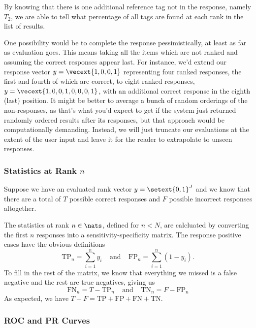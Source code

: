 By knowing that there is one additional reference tag not in the
response, namely $T_2$, we are able to tell what percentage of all
tags are found at each rank in the list of results.

One possibility would be to complete the response pessimistically, at
least as far as evaluation goes.  This means taking all the items
which are not ranked and assuming the correct responses appear last.
For instance, we'd extend our response vector $y = \vecext{1,0,0,1}$
representing four ranked responses, the first and fourth of which are
correct, to eight ranked responses, $y = \vecext{1,0,0,1,0,0,0,1}$,
with an additional correct response in the eighth (last) position.  It
might be better to average a bunch of random orderings of the
non-responses, as that's what you'd expect to get if the system just
returned randomly ordered results after its responses, but that
approach would be computationally demanding.  Instead, we will just
truncate our evaluations at the extent of the user input and leave
it for the reader to extrapolate to unseen responses.

\subsubsection{Statistics at Rank $n$}

Suppose we have an evaluated rank vector $y = \setext{0,1}^J$
and we know that there are a total of $T$ possible correct
responses and $F$ possible incorrect responses altogether.

The statistics at rank $n \in \nats$, defined for $n < N$, are
calcluated by converting the first $n$ responses into a
sensitivity-specificity matrix.  The response positive cases
have the obvious definitions
%
\begin{equation}
\mbox{TP}_n = \sum_{i=1}^n y_i
\ \ \ \ \ \mbox{and} \ \ \ \ \
\mbox{FP}_n = \sum_{i=1}^n (1-y_i).
\end{equation}
%
To fill in the rest of the matrix, we know that everything we missed
is a false negative and the rest are true negatives, giving us
%
\begin{equation}
\mbox{FN}_n = T - \mbox{TP}_n
\ \ \ \ \ \mbox{and} \ \ \ \ \
\mbox{TN}_n = F - \mbox{FP}_n
\end{equation}
%
As expected, we have $T+F = \mbox{TP} + \mbox{FP} + \mbox{FN} +
\mbox{TN}$.

\subsubsection{ROC and PR Curves}

